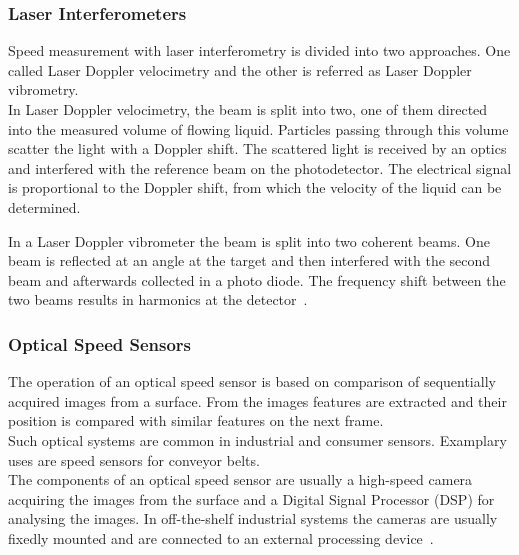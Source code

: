 \documentclass[12pt,a4paper]{article}
\begin{document}
\subsubsection{Laser Interferometers}

Speed measurement with laser interferometry is divided into two approaches.
One called Laser Doppler velocimetry and the other is referred as Laser Doppler vibrometry.\\

In Laser Doppler velocimetry, the beam is split into two, one of them directed into the measured volume of flowing liquid.
Particles passing through this volume scatter the light with a Doppler shift. 
The scattered light is received by an optics and interfered with the reference beam on the photodetector.
The electrical signal is proportional to the Doppler shift, from which the velocity of the liquid can be determined.



In a Laser Doppler vibrometer the beam is split into two coherent beams.
One beam is reflected at an angle at the target and then interfered with the second beam and afterwards collected in a photo diode. 
The frequency shift between the two beams results in harmonics at the detector~\cite{vibro}.






\subsubsection{Optical Speed Sensors}

The operation of an optical speed sensor is based on comparison of sequentially acquired images from a surface.
From the images features are extracted and their position is compared with similar features on the next frame.\\
Such optical systems are common in industrial and consumer sensors.
Examplary uses are speed sensors for conveyor belts.\\
The components of an optical speed sensor are usually a high-speed camera acquiring the images from the surface and a Digital Signal Processor (DSP) for analysing the images.
In off-the-shelf industrial systems the cameras are usually fixedly mounted and are connected to an external processing device~\cite{opt_vel}.
\end{document}
